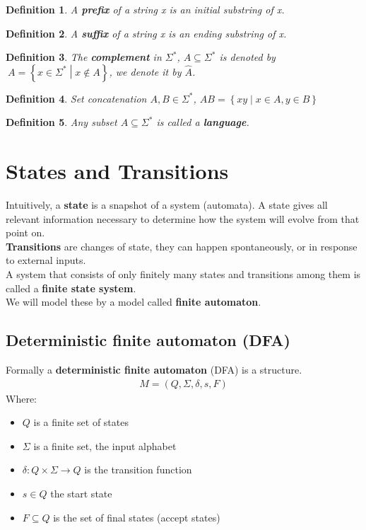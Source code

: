 \documentclass[a4paper]{article}
\newtheorem{definition}{Definition}
\begin{document}
\begin{definition}
    A \textbf{prefix} of a string x is an initial substring of x.
\end{definition}
\begin{definition}
    A \textbf{suffix} of a string x is an ending substring of x.
\end{definition}
\begin{definition}
    The \textbf{complement} in $\Sigma^*$, $A\subseteq\Sigma^*$ is denoted by
    $~A=\left\{ x\in\Sigma^* \middle| x\notin A \right\}$, we denote it by $\hat{A}$.
\end{definition}
\begin{definition}
    Set concatenation $A,B\in\Sigma^*$, $AB=\left\{ xy \middle | x\in A, y\in B \right\}$
\end{definition}
\begin{definition}
    Any subset $A\subseteq \Sigma^*$ is called a \textbf{language}.
\end{definition}
\section{States and Transitions}
Intuitively, a \textbf{state} is a snapshot of a system (automata). A state gives
all relevant information necessary to determine how the system will evolve from
that point on.
\\\textbf{Transitions} are changes of state, they can happen spontaneously, or in response
to external inputs.
\\A system that consists of only finitely many states and transitions among
them is called a \textbf{finite state system}.
\\We will model these by a model called \textbf{finite automaton}.
\subsection{Deterministic finite automaton (DFA)}
Formally a \textbf{deterministic finite automaton} (DFA) is a structure.
\begin{align*}
    M=(Q,\Sigma,\delta,s,F)
\end{align*}
Where:
\begin{itemize}
    \item $Q$ is a finite set of states
    \item $\Sigma$ is a finite set, the input alphabet
    \item $\delta : Q\times\Sigma\rightarrow Q$ is the transition function
    \item $s\in Q$ the start state
    \item $F\subseteq Q$ is the set of final states (accept states)
\end{itemize}
\end{document}
